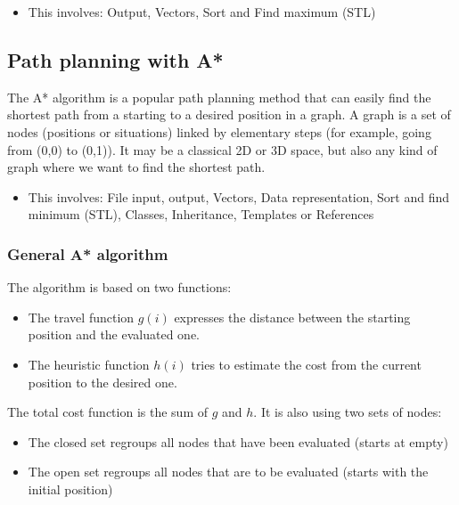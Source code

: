 \documentclass{ecnreport}
\begin{document}
\begin{itemize}
 \item This involves: Output, Vectors, Sort and Find maximum (STL)
 \end{itemize}
 
 
 
 
 \subsection{Path planning with A*}
 
 The A* algorithm is a popular path planning method that can easily find the shortest path from a starting to a desired position in a graph. 
 A graph is a set of nodes (positions or situations) linked by elementary steps (for example, going from (0,0) to (0,1)). It may be a classical 2D or 3D space, but
 also any kind of graph where we want to find the shortest path. 
 
 \begin{itemize}
 \item This involves: File input, output, Vectors, Data representation, Sort and find minimum (STL), Classes, Inheritance, Templates or References
 \end{itemize}
 
 \subsubsection{General A* algorithm}
 The algorithm is based on two functions:
 \begin{itemize}
  \item The travel function $g(i)$ expresses the distance between the starting position and the evaluated one. 
  \item The heuristic function $h(i)$ tries to estimate the cost from the current position to the desired one. 
 \end{itemize}The total cost function is the sum of $g$ and $h$.
It is also using two sets of nodes:
\begin{itemize}
 \item The closed set regroups all nodes that have been evaluated (starts at empty)
 \item The open set regroups all nodes that are to be evaluated (starts with the initial position)
\end{itemize}
\end{document}
